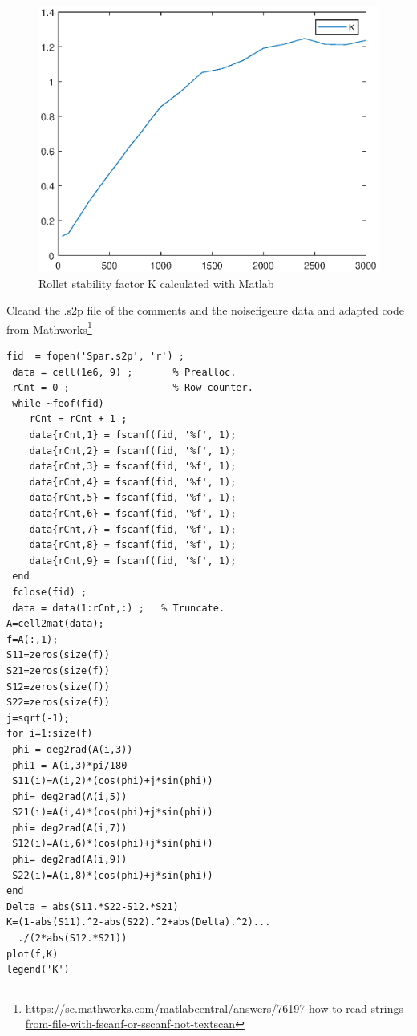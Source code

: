\documentclass{article}
\begin{document}
\begin{multicols}{2}
\begin{enumerate}[label=(\alph*)]
\begin{figure}[H]
  \includegraphics[width=\linewidth]{K.eps}
  \caption{Rollet stability factor K calculated with Matlab}
  \label{fig4}
\end{figure}
Cleand the .s2p file of the comments and the noisefigeure data and adapted 
code from Mathworks\footnote{\url{https://se.mathworks.com/matlabcentral/answers/76197-how-to-read-strings-from-file-with-fscanf-or-sscanf-not-textscan}}
\begin{verbatim}
fid  = fopen('Spar.s2p', 'r') ;
 data = cell(1e6, 9) ;       % Prealloc.
 rCnt = 0 ;                  % Row counter.
 while ~feof(fid)
    rCnt = rCnt + 1 ;
    data{rCnt,1} = fscanf(fid, '%f', 1);
    data{rCnt,2} = fscanf(fid, '%f', 1);
    data{rCnt,3} = fscanf(fid, '%f', 1);
    data{rCnt,4} = fscanf(fid, '%f', 1);
    data{rCnt,5} = fscanf(fid, '%f', 1);
    data{rCnt,6} = fscanf(fid, '%f', 1);
    data{rCnt,7} = fscanf(fid, '%f', 1);
    data{rCnt,8} = fscanf(fid, '%f', 1);
    data{rCnt,9} = fscanf(fid, '%f', 1);
 end
 fclose(fid) ;
 data = data(1:rCnt,:) ;   % Truncate.
A=cell2mat(data);
f=A(:,1);
S11=zeros(size(f))
S21=zeros(size(f))
S12=zeros(size(f))
S22=zeros(size(f))
j=sqrt(-1);
for i=1:size(f)
 phi = deg2rad(A(i,3))
 phi1 = A(i,3)*pi/180
 S11(i)=A(i,2)*(cos(phi)+j*sin(phi))
 phi= deg2rad(A(i,5))
 S21(i)=A(i,4)*(cos(phi)+j*sin(phi))
 phi= deg2rad(A(i,7))
 S12(i)=A(i,6)*(cos(phi)+j*sin(phi))
 phi= deg2rad(A(i,9))
 S22(i)=A(i,8)*(cos(phi)+j*sin(phi))
end
Delta = abs(S11.*S22-S12.*S21)
K=(1-abs(S11).^2-abs(S22).^2+abs(Delta).^2)...
  ./(2*abs(S12.*S21))
plot(f,K)
legend('K')
\end{verbatim}
\end{enumerate}
\end{multicols}
\end{document}
